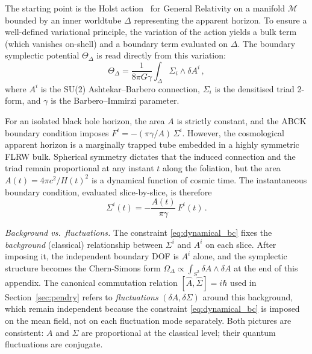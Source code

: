 \documentclass[aps,prd,twocolumn,10pt,superscriptaddress,nofootinbib]{revtex4-2}
\begin{document}
The starting point is the Holst action~\cite{Holst1996} for General Relativity on
a manifold $\mathcal{M}$ bounded by an inner worldtube $\Delta$
representing the apparent horizon.  To ensure a well-defined
variational principle, the variation of the action yields a bulk
term (which vanishes on-shell) and a boundary term evaluated on
$\Delta$.  The boundary symplectic potential $\Theta_\Delta$ is
read directly from this variation:
\begin{equation}
\Theta_\Delta
  = \frac{1}{8\pi G \gamma}
    \int_\Delta \Sigma_i \wedge \delta A^i\,,
\label{eq:symplectic_potential}
\end{equation}
where $A^i$ is the SU(2) Ashtekar--Barbero connection,
$\Sigma_i$ is the densitised triad 2-form, and $\gamma$ is the
Barbero--Immirzi parameter.

For an isolated black hole horizon, the area $A$ is strictly
constant, and the ABCK boundary condition imposes
$F^i = -(\pi\gamma/A)\,\Sigma^i$.  However, the cosmological
apparent horizon is a marginally trapped tube embedded in a highly
symmetric FLRW bulk.  Spherical symmetry dictates that the induced
connection and the triad remain proportional at any instant $t$
along the foliation, but the area
$A(t) = 4\pi c^2/H(t)^2$ is a dynamical function of cosmic time.
The instantaneous boundary condition, evaluated slice-by-slice, is
therefore
\begin{equation}
\Sigma^i(t) = -\frac{A(t)}{\pi\gamma}\,F^i(t)\,.
\label{eq:dynamical_bc}
\end{equation}

\noindent\textit{Background vs.\ fluctuations.}  The constraint
\eqref{eq:dynamical_bc} fixes the \emph{background} (classical)
relationship between $\Sigma^i$ and $A^i$ on each slice.
After imposing it, the independent boundary DOF is $A^i$ alone,
and the symplectic structure becomes the Chern-Simons form
$\Omega_\Delta \propto \int_{S^2} \delta A \wedge \delta A$ at the
end of this appendix.  The canonical commutation relation
$[\hat{A},\hat{\Sigma}] = i\hbar$ used in
Section~\ref{sec:pendry} refers to \emph{fluctuations}
$(\delta A, \delta\Sigma)$ around this background, which remain
independent because the constraint \eqref{eq:dynamical_bc} is
imposed on the mean field, not on each fluctuation mode
separately.  Both pictures are consistent: $A$ and $\Sigma$ are
proportional at the classical level; their quantum fluctuations
are conjugate.
\end{document}
